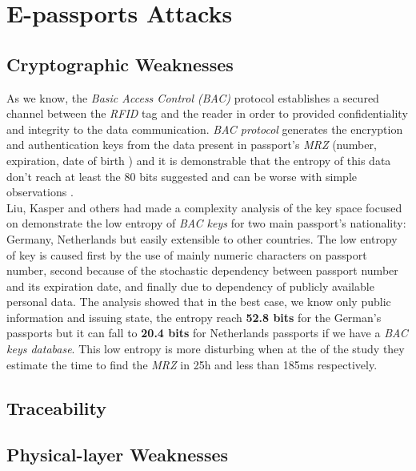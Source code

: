 \documentclass{acm_proc_article-sp}
\begin{document}
\section{E-passports Attacks}

\subsection{Cryptographic Weaknesses}
As we know, the \textit{Basic Access Control (BAC)} protocol establishes a secured channel between 
the \textit{RFID} tag and the reader in order to provided confidentiality and integrity to the 
data communication. \textit{BAC protocol} generates the encryption and authentication keys from the data 
present in passport's \textit {MRZ} (number, expiration, date of birth ) and it is demonstrable 
that the entropy of this data don’t reach at least the 80 bits suggested and can be worse 
with simple observations \cite{JUAR2005} \cite{02COPA}.\\
Liu, Kasper and others \cite{02COPA} had made a complexity analysis of the key space focused on 
demonstrate the low entropy of \textit{BAC keys} for two main passport’s nationality: Germany, 
Netherlands but easily extensible to other countries. The low entropy of key is caused 
first by the use of mainly numeric characters on passport number, 
second because of the stochastic dependency between passport number and its expiration 
date, and finally due to dependency of publicly available personal data. The analysis 
showed that in the best case, we know only public information and issuing state, the 
entropy reach \textbf {52.8 bits} for the German’s passports but it can fall to \textbf {20.4 bits} for 
Netherlands passports if we have a \textit{BAC keys database}. This low entropy is more disturbing 
when at the of the study they estimate the time to find the \textit{MRZ} in 25h and less than 185ms 
respectively.


\subsection{Traceability}

\subsection{Physical-layer Weaknesses}
\end{document}

